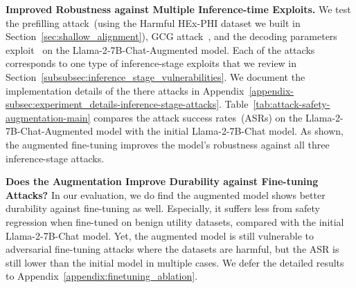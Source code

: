 \textbf{Improved Robustness against Multiple Inference-time Exploits.} We test the prefilling attack~(using the Harmful HEx-PHI dataset we built in Section~\ref{sec:shallow_alignment}), GCG attack~\cite{zou2023universal}, and the decoding parameters exploit~\cite{huang2023catastrophic} on the Llama-2-7B-Chat-Augmented model. Each of the attacks corresponds to one type of inference-stage exploits that we review in Section~\ref{subsubsec:inference_stage_vulnerabilities}. We document the implementation details of the there attacks in Appendix~\ref{appendix-subsec:experiment_details-inference-stage-attacks}. Table~\ref{tab:attack-safety-augmentation-main} compares the attack success rates~(ASRs) on the Llama-2-7B-Chat-Augmented model with the initial Llama-2-7B-Chat model. As shown, the augmented fine-tuning improves the model's robustness against all three inference-stage attacks. 






\textbf{Does the Augmentation Improve Durability against Fine-tuning Attacks?} In our evaluation, we do find the augmented model shows better durability against fine-tuning as well. Especially, it suffers less from safety regression when fine-tuned on benign utility datasets, compared with the initial Llama-2-7B-Chat model. Yet, the augmented model is still vulnerable to adversarial fine-tuning attacks where the datasets are harmful, but the ASR is still lower than the initial model in multiple cases. We defer the detailed results to Appendix~\ref{appendix:finetuning_ablation}.























